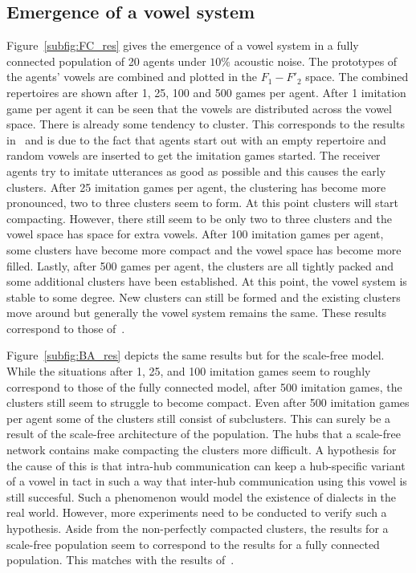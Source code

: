 \documentclass[11pt]{article}
\begin{document}
\subsection{Emergence of a vowel system}
Figure~\ref{subfig:FC_res} gives the emergence of a vowel system in a fully connected population of 20 agents under $10\%$ acoustic noise.
The prototypes of the agents' vowels are combined and plotted in the $F_1-F'_2$ space. The combined repertoires are shown after 1, 25, 100 and 500 games per agent.
After 1 imitation game per agent it can be seen that the vowels are distributed across the vowel space. There is already some tendency to cluster.
This corresponds to the results in~ and is due to the fact that agents start out with an empty repertoire and
random vowels are inserted to get the imitation games started. The receiver agents try to imitate utterances as good as possible and this causes the early clusters.
After 25 imitation games per agent, the clustering has become more pronounced, two to three clusters seem to form. At this point clusters will start compacting.
However, there still seem to be only two to three clusters and the vowel space has space for extra vowels.
After 100 imitation games per agent, some clusters have become more compact and the vowel space has become more filled.
Lastly, after 500 games per agent, the clusters are all tightly packed and some additional clusters have been established.
At this point, the vowel system is stable to some degree. New clusters can still be formed and the existing clusters move around but generally the vowel system remains the same.
These results correspond to those of~.

Figure~\ref{subfig:BA_res} depicts the same results but for the scale-free model.
While the situations after 1, 25, and 100 imitation games seem to roughly correspond to those of the fully connected model, after 500 imitation games, the clusters still seem
to struggle to become compact. Even after 500 imitation games per agent some of the clusters still consist of subclusters.
This can surely be a result of the scale-free architecture of the population.
The hubs that a scale-free network contains make compacting the clusters more difficult.
A hypothesis for the cause of this is that intra-hub communication can keep a hub-specific variant of a vowel in tact in such a way that inter-hub
communication using this vowel is still succesful. Such a phenomenon would model the existence of dialects in the real world.
However, more experiments need to be conducted to verify such a hypothesis.
Aside from the non-perfectly compacted clusters, the results for a scale-free population seem to correspond to the results for a fully connected population.
This matches with the results of~.
\end{document}
